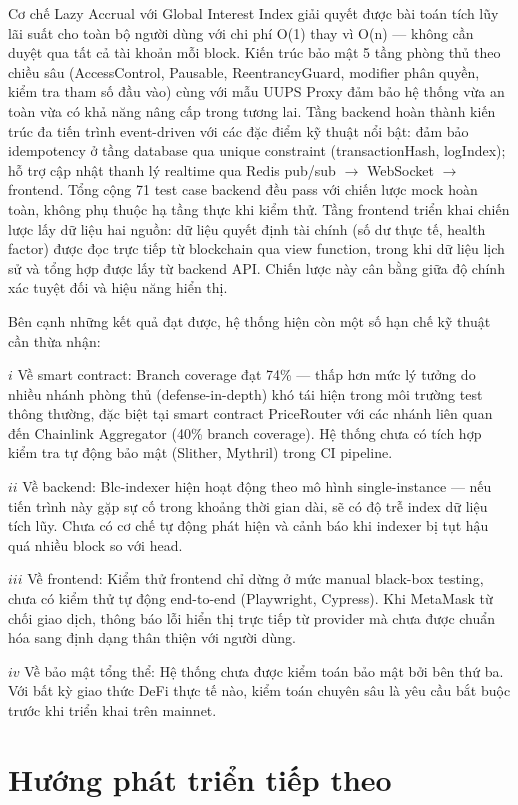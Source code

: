 \documentclass[../DoAn.tex]{subfiles}
\begin{document}
Cơ chế Lazy Accrual với Global Interest Index giải quyết được bài toán tích lũy lãi suất cho toàn bộ người dùng với chi phí O(1) thay vì O(n) --- không cần duyệt qua tất cả tài khoản mỗi block. Kiến trúc bảo mật 5 tầng phòng thủ theo chiều sâu (AccessControl, Pausable, ReentrancyGuard, modifier phân quyền, kiểm tra tham số đầu vào) cùng với mẫu UUPS Proxy đảm bảo hệ thống vừa an toàn vừa có khả năng nâng cấp trong tương lai. Tầng backend hoàn thành kiến trúc đa tiến trình event-driven với các đặc điểm kỹ thuật nổi bật: đảm bảo idempotency ở tầng database qua unique constraint (transactionHash, logIndex); hỗ trợ cập nhật thanh lý realtime qua Redis pub/sub $\rightarrow$ WebSocket $\rightarrow$ frontend. Tổng cộng 71 test case backend đều pass với chiến lược mock hoàn toàn, không phụ thuộc hạ tầng thực khi kiểm thử. Tầng frontend triển khai chiến lược lấy dữ liệu hai nguồn: dữ liệu quyết định tài chính (số dư thực tế, health factor) được đọc trực tiếp từ blockchain qua view function, trong khi dữ liệu lịch sử và tổng hợp được lấy từ backend API. Chiến lược này cân bằng giữa độ chính xác tuyệt đối và hiệu năng hiển thị.

Bên cạnh những kết quả đạt được, hệ thống hiện còn một số hạn chế kỹ thuật cần thừa nhận:

\(i\) Về smart contract: Branch coverage đạt 74\% --- thấp hơn mức lý tưởng do nhiều nhánh phòng thủ (defense-in-depth) khó tái hiện trong môi trường test thông thường, đặc biệt tại smart contract PriceRouter với các nhánh liên quan đến Chainlink Aggregator (40\% branch coverage). Hệ thống chưa có tích hợp kiểm tra tự động bảo mật (Slither, Mythril) trong CI pipeline.

\(ii\) Về backend: Blc-indexer hiện hoạt động theo mô hình single-instance --- nếu tiến trình này gặp sự cố trong khoảng thời gian dài, sẽ có độ trễ index dữ liệu tích lũy. Chưa có cơ chế tự động phát hiện và cảnh báo khi indexer bị tụt hậu quá nhiều block so với head.

\(iii\) Về frontend: Kiểm thử frontend chỉ dừng ở mức manual black-box testing, chưa có kiểm thử tự động end-to-end (Playwright, Cypress). Khi MetaMask từ chối giao dịch, thông báo lỗi hiển thị trực tiếp từ provider mà chưa được chuẩn hóa sang định dạng thân thiện với người dùng.

\(iv\) Về bảo mật tổng thể: Hệ thống chưa được kiểm toán bảo mật bởi bên thứ ba. Với bất kỳ giao thức DeFi thực tế nào, kiểm toán chuyên sâu là yêu cầu bắt buộc trước khi triển khai trên mainnet.

\section{Hướng phát triển tiếp theo}
\end{document}
